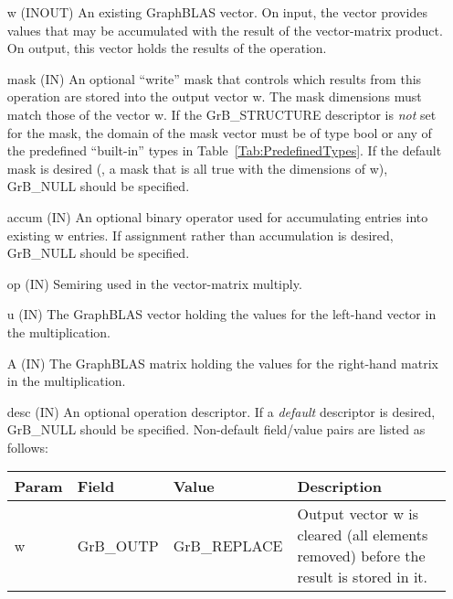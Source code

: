 \begin{itemize}[leftmargin=1.1in]
    \item[{\sf w}]    ({\sf INOUT}) An existing GraphBLAS vector.  On input,
    the vector provides values that may be accumulated with the result of the
    vector-matrix product.  On output, this vector holds the results of the
    operation.

    \item[{\sf mask}] ({\sf IN}) An optional ``write'' mask that controls which
    results from this operation are stored into the output vector {\sf w}. The 
    mask dimensions must match those of the vector {\sf w}. If the 
    {\sf GrB\_STRUCTURE} descriptor is {\em not} set for the mask, the domain of the
    {\sf mask} vector must be of type {\sf bool} or any of the predefined 
    ``built-in'' types in Table~\ref{Tab:PredefinedTypes}.  If the default
    mask is desired (\ie, a mask that is all {\sf true} with the dimensions of {\sf w}), 
    {\sf GrB\_NULL} should be specified.

    \item[{\sf accum}] ({\sf IN}) An optional binary operator used for accumulating
    entries into existing {\sf w} entries.
    If assignment rather than accumulation is
    desired, {\sf GrB\_NULL} should be specified.

    \item[{\sf op}]   ({\sf IN}) Semiring used in the vector-matrix
    multiply.

    \item[{\sf u}]    ({\sf IN}) The GraphBLAS vector holding the values for
    the left-hand vector in the multiplication.

    \item[{\sf A}]    ({\sf IN}) The GraphBLAS matrix holding the values
    for the right-hand matrix in the multiplication.

    \item[{\sf desc}] ({\sf IN}) An optional operation descriptor. If
    a \emph{default} descriptor is desired, {\sf GrB\_NULL} should be
    specified. Non-default field/value pairs are listed as follows:  \\

    \hspace*{-2em}\begin{tabular}{lllp{2.7in}}
        Param & Field  & Value & Description \\
        \hline
        {\sf w}    & {\sf GrB\_OUTP} & {\sf GrB\_REPLACE} & Output vector {\sf w}
        is cleared (all elements removed) before the result is stored in it.\\


\end{tabular}
\end{itemize}
